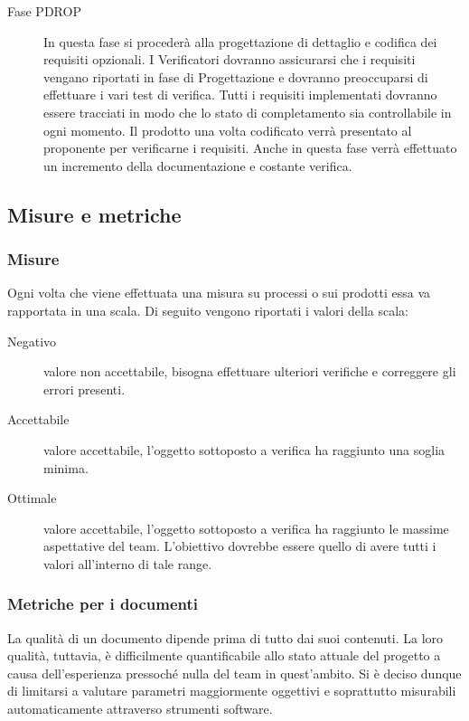 \documentclass[../PianoDiQualifica.tex]{subfiles}
\begin{document}
\begin{description}
		 	\item[Fase PDROP] In questa fase si procederà alla progettazione di dettaglio e codifica dei requisiti opzionali. I Verificatori dovranno assicurarsi che i requisiti vengano riportati in fase di Progettazione e dovranno preoccuparsi di effettuare i vari test di verifica. Tutti i requisiti implementati dovranno essere tracciati in modo che lo stato di completamento sia controllabile in ogni momento. Il prodotto una volta codificato verrà presentato al proponente per verificarne i requisiti. Anche in questa fase verrà effettuato un incremento della documentazione e costante verifica.
		\end{description}
		\subsection{Misure e metriche}
			\subsubsection{Misure}
			Ogni volta che viene effettuata una misura su processi o sui prodotti essa va rapportata in una scala. Di seguito vengono riportati i valori della scala:
			\begin{description}
			\item[Negativo] valore non accettabile, bisogna effettuare ulteriori verifiche e correggere gli errori presenti.
			\item[Accettabile] valore accettabile, l'oggetto sottoposto a verifica ha raggiunto una soglia minima.
			\item[Ottimale] valore accettabile, l'oggetto sottoposto a verifica ha raggiunto le massime aspettative del team. L'obiettivo dovrebbe essere quello di avere tutti i valori all'interno di tale range. 
			\end{description}
			\subsubsection{Metriche per i documenti}
			La qualità di un documento dipende prima di tutto dai suoi contenuti. La loro qualità, tuttavia, è difficilmente quantificabile allo stato attuale del progetto a causa dell'esperienza pressoché nulla del team in quest'ambito. Si è deciso dunque di limitarsi a valutare parametri maggiormente oggettivi e soprattutto misurabili automaticamente attraverso strumenti software.
\end{document}
